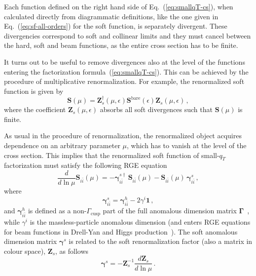 \documentclass{PoS}
\newcommand{\iibar}{{i \bar i}}
\newcommand{\bfS}{\bm{S}}
\newcommand{\bfgamma}{\bm{\gamma}}
\newcommand{\bfI}{\bm{1}}
\newcommand{\bfGamma}{\bm{\Gamma}}
\newcommand{\bfZ}{\bm{Z}}
\newcommand{\bare}{\text{bare}}
\begin{document}
Each function defined on the right hand side of Eq.~(\ref{eq:smallqT-cs}), when
calculated directly from diagrammatic definitions, like the one given in
Eq.~(\ref{eq:sf-all-orders}) for the soft function, is separately divergent.
These divergencies correspond to soft and collinear limits and they must cancel
between the hard, soft and beam functions, as the entire cross section has to be
finite. 

It turns out to be useful to remove divergences also at the level of the
functions entering the factorization formula~(\ref{eq:smallqT-cs}). This can be
achieved by the procedure of multiplicative renormalization. For example, the
renormalized soft function is given by
%
\begin{equation}
  \bfS(\mu) = \bfZ^\dagger_s(\mu,\epsilon) \bfS^\bare(\epsilon)
  \bfZ_s(\mu,\epsilon)\,,
  \label{eq:Srendef}
\end{equation}
%
where the coefficient $\bfZ_s(\mu,\epsilon)$ absorbs all soft divergences such
that $\bfS(\mu)$ is finite.

As usual in the procedure of renormalization, the renormalized object acquires
dependence on an arbitrary parameter $\mu$, which has to vanish at the level of
the cross section. This implies that the renormalized soft function of
small-$q_T$ factorization must satisfy the following RGE
equation~\cite{Zhu:2012ts}
%
\begin{equation}
  \frac{d}{d\ln \mu} \bfS_\iibar (\mu) =
  - \bfgamma^{s \dagger}_\iibar \,\bfS_\iibar (\mu)  
  - \bfS_\iibar (\mu)\, \bfgamma^{s}_\iibar \,,
  \label{eq:SF-RGE-main}
\end{equation}
%
where
%
\begin{equation}
  \bfgamma^{s}_\iibar = \bfgamma^{h}_\iibar - 2 \gamma^{i} \bfI\,,
\end{equation}
%
and $\bfgamma^{h}_\iibar$ is defined as a non-$\Gamma_\text{cusp}$ part of the
full anomalous dimension matrix $\bfGamma$~\cite{Ahrens:2010zv}, while
$\gamma^{i}$ is the massless-particle anomalous dimension (and enters RGE
equations for beam functions in Drell-Yan and Higgs
production~\cite{Becher:2010tm, Becher:2012yn}). 
%
The soft anomalous dimension matrix $\bfgamma^{s}$ is related to the soft
renormalization factor (also a matrix in colour space), $\bfZ_s$, as follows
%
\begin{equation}
  \bfgamma^{s} = - \bfZ_s^{-1}\frac{d\bfZ_s}{d\ln \mu}\,.
\end{equation}
\end{document}
